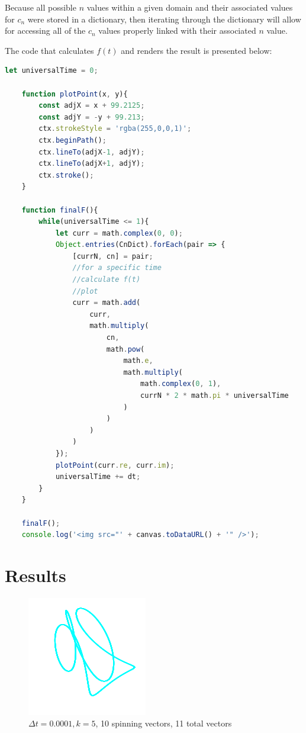 \documentclass[letterpaper, 12pt]{article}
\begin{document}
Because all possible \(n\) values within a given domain and
their associated values for \(c_n\) were stored in a dictionary,
then iterating through the dictionary will allow for accessing
all of the \(c_n\) values properly linked with their associated \(n\) value.

The code that calculates \(f(t)\) and renders the result is presented below:
\begin{lstlisting}[language=JavaScript]
    let universalTime = 0;

    function plotPoint(x, y){
        const adjX = x + 99.2125;
        const adjY = -y + 99.213;
        ctx.strokeStyle = 'rgba(255,0,0,1)';
        ctx.beginPath();
        ctx.lineTo(adjX-1, adjY);
        ctx.lineTo(adjX+1, adjY);
        ctx.stroke();
    }

    function finalF(){
        while(universalTime <= 1){
            let curr = math.complex(0, 0);
            Object.entries(CnDict).forEach(pair => {
                [currN, cn] = pair;
                //for a specific time
                //calculate f(t)
                //plot
                curr = math.add(
                    curr,
                    math.multiply(
                        cn,
                        math.pow(
                            math.e,
                            math.multiply(
                                math.complex(0, 1),
                                currN * 2 * math.pi * universalTime
                            )
                        )
                    )
                )
            });
            plotPoint(curr.re, curr.im);
            universalTime += dt;
        }
    }

    finalF();
    console.log('<img src="' + canvas.toDataURL() + '" />');
\end{lstlisting}

\section{Results}

\begin{figure}[H]
    \centering
    \includegraphics[width=.5\textwidth]{5.png}
    \caption{\protect\(\Delta t = 0.0001, k = 5\), 10 spinning vectors, 11 total vectors}
\end{figure}
\end{document}
